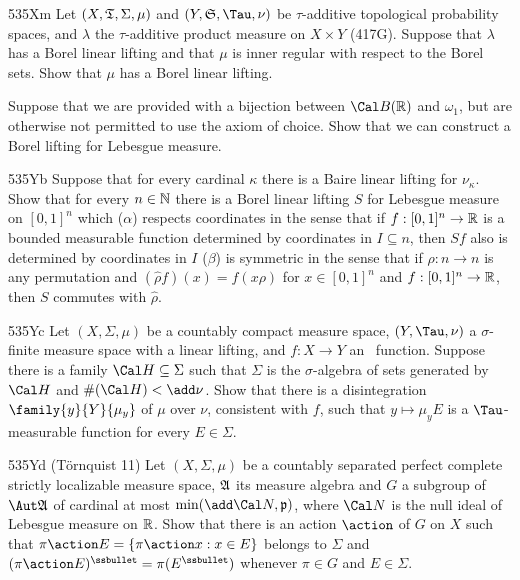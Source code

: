{\spheader 535Xm Let $(X,\frak T,\Sigma,\mu)$ and $(Y,\frak S,\Tau,\nu)$
be $\tau$-additive topological probability spaces, and $\lambda$ the
$\tau$-additive product measure on $X\times Y$ (417G).   Suppose that
$\lambda$ has a Borel linear lifting and that $\mu$ is inner regular
with respect to the Borel sets.   Show that $\mu$ has a Borel linear
lifting.
%

Suppose that we are provided with a bijection between
$\Cal B(\Bbb R)$ and $\omega_1$, but are otherwise not permitted to use
the axiom of choice.   Show that we can construct a Borel lifting for
Lebesgue measure.

\spheader 535Yb Suppose that for every cardinal $\kappa$ there is a
Baire linear lifting for $\nu_{\kappa}$.   Show that for every
$n\in\Bbb N$ there is a Borel linear lifting $S$ for Lebesgue measure on
$[0,1]^n$ which ($\alpha$) respects coordinates in the sense that if
$f:[0,1]^n\to\Bbb R$ is a bounded measurable function determined by
coordinates in
$I\subseteq n$, then $Sf$ also is determined by coordinates in $I$ 
($\beta$) is symmetric in the sense that if $\rho:n\to n$ is any 
permutation and
$(\hat\rho f)(x)=f(x\rho)$ for $x\in[0,1]^n$ and $f:[0,1]^n\to\Bbb R$,
then $S$ commutes with $\hat\rho$.


\spheader 535Yc Let $(X,\Sigma,\mu)$ be a countably compact
measure space, $(Y,\Tau,\nu)$ a $\sigma$-finite measure space with a
linear lifting, and
$f:X\to Y$ an \imp\ function.   Suppose there is a family
$\Cal H\subseteq\Sigma$ such that $\Sigma$ is the $\sigma$-algebra of
sets generated by $\Cal H$ and $\#(\Cal H)<\add\nu$.   Show that there
is a disintegration
$\family{y}{Y}{\mu_y}$ of $\mu$ over $\nu$, consistent with $f$, such
that $y\mapsto\mu_yE$ is a $\Tau$-measurable function for every
$E\in\Sigma$.

\spheader 535Yd
({\smc T\"ornquist 11}) Let $(X,\Sigma,\mu)$ be a countably separated
perfect complete strictly localizable measure space,
$\frak A$ its measure algebra and $G$ a subgroup of $\Aut\frak A$ of
cardinal at most $\min(\add\Cal N,\frak p)$, where $\Cal N$ is the
null ideal of Lebesgue measure on $\Bbb R$.   Show that there is an action
$\action$ of $G$ on $X$ such that
$\pi\action E=\{\pi\action x:x\in E\}$ belongs to $\Sigma$ and
$(\pi\action E)^{\ssbullet}=\pi(E^{\ssbullet})$ whenever
$\pi\in G$ and $E\in\Sigma$.   
}%

